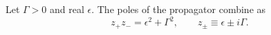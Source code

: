 \documentclass{article}
\begin{document}
Let $\Gamma>0$ and real $\epsilon$. The poles of the propagator combine as
\begin{equation}
z_+ z_- = \epsilon^2 + \Gamma^2, \qquad z_\pm \equiv \epsilon \pm i\Gamma .
\label{eq:zz}
\end{equation}
\end{document}
